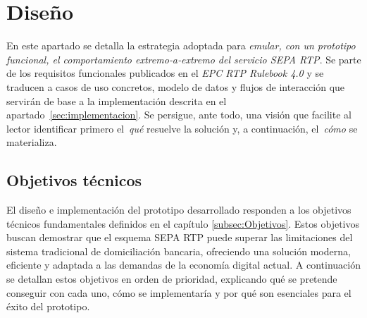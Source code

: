 \chapter{Diseño}
\label{sec:diseno}

En este apartado se detalla la estrategia adoptada para \emph{emular, con un prototipo funcional, el comportamiento extremo‑a‑extremo del servicio SEPA RTP}. Se parte de los requisitos funcionales publicados en el \emph{EPC RTP Rulebook 4.0} y se traducen a casos de uso concretos, modelo de datos y flujos de interacción que servirán de base a la implementación descrita en el apartado~\ref{sec:implementacion}. Se persigue, ante todo, una visión que facilite al lector identificar primero el~\emph{qué} resuelve la solución y, a continuación, el~\emph{cómo} se materializa.

\section{Objetivos técnicos}
\label{subsec:diseno_objetivos}


El diseño e implementación del prototipo desarrollado responden a los objetivos técnicos fundamentales definidos en el capítulo \ref{subsec:Objetivos}. Estos objetivos buscan demostrar que el esquema SEPA RTP puede superar las limitaciones del sistema tradicional de domiciliación bancaria, ofreciendo una solución moderna, eficiente y adaptada a las demandas de la economía digital actual. A continuación se detallan estos objetivos en orden de prioridad, explicando qué se pretende conseguir con cada uno, cómo se implementaría y por qué son esenciales para el éxito del prototipo.


